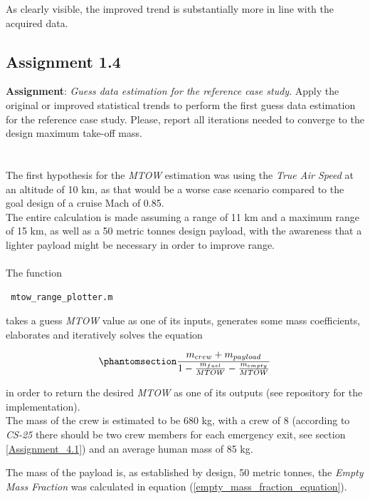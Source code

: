 \documentclass{article}
\begin{document}
As clearly visible, the improved trend is substantially more in line with the acquired data.


\clearpage
\subsection{Assignment 1.4\label{Assignments_1.4}}
\textbf{Assignment}: \textit{Guess data estimation for the reference
case study}. Apply the original or improved statistical trends to
perform the first guess data estimation for the reference case
study. Please, report all iterations needed to converge to the
design maximum take-off mass.\\ \\ \\ 

The first hypothesis for the \textit{MTOW} estimation was using the \textit{True Air Speed}
at an altitude of 10 km, as that would be a worse case scenario compared to the goal design
of a cruise Mach of 0.85. \\ 
The entire calculation is made assuming a range of 11 km and a maximum range of 15 km, as well as
a 50 metric tonnes design payload, with the awareness that a lighter payload might be necessary
in order to improve range.\\ \\
The function \begin{verbatim} mtow_range_plotter.m \end{verbatim} takes a guess \textit{MTOW} value as one of its inputs, generates some mass coefficients,
elaborates and iteratively solves the equation

\begin{equation}
    \phantomsection
    \label{mtow_esitmate_equation}
    \frac{m_{crew} + m_{payload}}{1 - \frac{m_{fuel}}{MTOW} - \frac{m_{empty}}{MTOW}} 
\end{equation}

in order to return the desired \textit{MTOW} as one of its outputs (see repository \autocite{Airbus_replacement_repo} for the implementation).\\ 

The mass of the crew is estimated to be 680 kg, with a crew of 8 (according to \textit{CS-25} \autocite{EASA_CS25} there should be two crew members for each emergency exit, see section \ref{Assignment_4.1}) and an average human mass of 85 kg.


The mass of the payload is, as established by design, 50 metric tonnes, the \textit{Empty Mass Fraction} was calculated in 
equation (\ref{empty_mass_fraction_equation}). 
\end{document}
